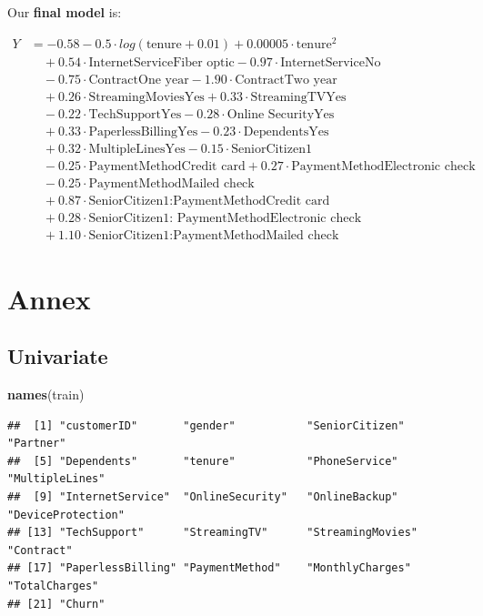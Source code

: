 \documentclass[
  twoside]{article}
\newenvironment{Shaded}{\begin{snugshade}}{\end{snugshade}}
\newcommand{\FunctionTok}[1]{\textcolor[rgb]{0.13,0.29,0.53}{\textbf{#1}}}
\newcommand{\NormalTok}[1]{#1}
\begin{document}
Our \textbf{final model} is:

\[
\begin{aligned}
Y &= -0.58 - 0.5 \cdot log(\text{tenure}+0.01) + 0.00005 \cdot \text{tenure}^2 \\
&\quad + 0.54 \cdot \text{InternetServiceFiber optic} - 0.97 \cdot \text{InternetServiceNo} \\
&\quad - 0.75 \cdot \text{ContractOne year} - 1.90 \cdot \text{ContractTwo year} \\
&\quad + 0.26 \cdot \text{StreamingMoviesYes} + 0.33 \cdot \text{StreamingTVYes} \\
&\quad - 0.22 \cdot \text{TechSupportYes} - 0.28 \cdot \text{Online SecurityYes} \\
&\quad + 0.33 \cdot \text{PaperlessBillingYes} - 0.23 \cdot \text{DependentsYes} \\
&\quad + 0.32 \cdot \text{MultipleLinesYes} - 0.15 \cdot \text{SeniorCitizen1} \\
&\quad - 0.25 \cdot \text{PaymentMethodCredit card} + 0.27 \cdot \text{PaymentMethodElectronic check} \\
&\quad - 0.25 \cdot \text{PaymentMethodMailed check} \\
&\quad + 0.87 \cdot \text{SeniorCitizen1:PaymentMethodCredit card} \\
&\quad + 0.28 \cdot \text{SeniorCitizen1: PaymentMethodElectronic check} \\
&\quad + 1.10 \cdot \text{SeniorCitizen1:PaymentMethodMailed check}
\end{aligned}
\]

\newpage

\hypertarget{annex}{%
\section{Annex}\label{annex}}

\hypertarget{univariate}{%
\subsection{Univariate}\label{univariate}}

\begin{Shaded}
\begin{Highlighting}[]
\FunctionTok{names}\NormalTok{(train)}
\end{Highlighting}
\end{Shaded}

\begin{verbatim}
##  [1] "customerID"       "gender"           "SeniorCitizen"    "Partner"         
##  [5] "Dependents"       "tenure"           "PhoneService"     "MultipleLines"   
##  [9] "InternetService"  "OnlineSecurity"   "OnlineBackup"     "DeviceProtection"
## [13] "TechSupport"      "StreamingTV"      "StreamingMovies"  "Contract"        
## [17] "PaperlessBilling" "PaymentMethod"    "MonthlyCharges"   "TotalCharges"    
## [21] "Churn"
\end{verbatim}
\end{document}
